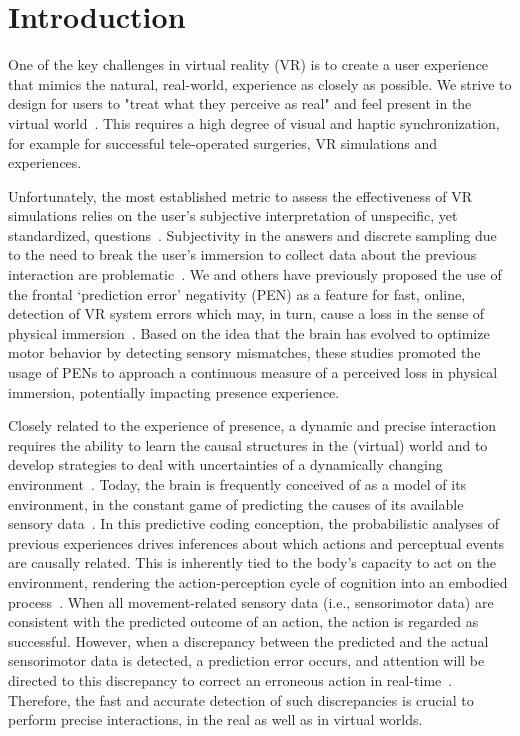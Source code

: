 \section{Introduction} 

One of the key challenges in virtual reality (VR) is to create a user experience that mimics the natural, real-world, experience as closely as possible. We strive to design for users to "treat what they perceive as real" and feel present in the virtual world~\cite{Slater2009-au}. This requires a high degree of visual and haptic synchronization, for example for successful tele-operated surgeries, VR simulations and experiences.

Unfortunately, the most established metric to assess the effectiveness of VR simulations relies on the user’s subjective interpretation of unspecific, yet standardized, questions~\cites{Schubert2003-sq, Witmer1998-ew}. Subjectivity in the answers and discrete sampling due to the need to break the user’s immersion to collect data about the previous interaction are problematic~\cite{Slater1999-dm}. We and others have previously proposed the use of the frontal `prediction error' negativity (PEN) as a feature for fast, online, detection of VR system errors which may, in turn, cause a loss in the sense of physical immersion~\cites{Gehrke2019-og, Si-mohammed2020-ru, Singh2018-qi}. Based on the idea that the brain has evolved to optimize motor behavior by detecting sensory mismatches, these studies promoted the usage of PENs to approach a continuous measure of a perceived loss in physical immersion, potentially impacting presence experience.

Closely related to the experience of presence, a dynamic and precise interaction requires the ability to learn the causal structures in the (virtual) world and to develop strategies to deal with uncertainties of a dynamically changing environment~\cite{Knill2004-sz}. Today, the brain is frequently conceived of as a model of its environment, in the constant game of predicting the causes of its available sensory data~\cites{Clark2013-ah, Friston2010-hy, Rao1999-zr}. In this predictive coding conception, the probabilistic analyses of previous experiences drives inferences about which actions and perceptual events are causally related. This is inherently tied to the body’s capacity to act on the environment, rendering the action-perception cycle of cognition into an embodied process~\cite{Friston2012-gq}. When all movement-related sensory data (i.e., sensorimotor data) are consistent with the predicted outcome of an action, the action is regarded as successful. However, when a discrepancy between the predicted and the actual sensorimotor data is detected, a prediction error occurs, and attention will be directed to this discrepancy to correct an erroneous action in real-time~\cite{Savoie2018-ad}. Therefore, the fast and accurate detection of such discrepancies is crucial to perform precise interactions, in the real as well as in virtual worlds.

